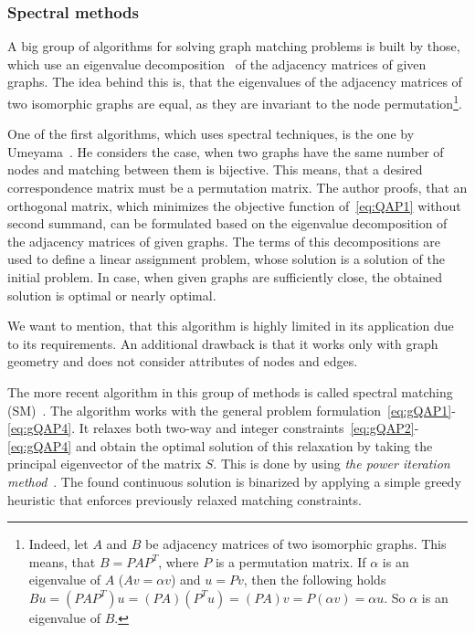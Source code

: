\subsubsection{Spectral methods}
A big group of algorithms for solving graph matching problems is built by those, which use an eigenvalue decomposition~\cite{Book_ConvOpt} of the adjacency matrices of given graphs. The idea behind this is, that the eigenvalues of the adjacency matrices of two isomorphic graphs are equal, as they are invariant to the node permutation\footnote{Indeed, let $A$ and $B$ be adjacency matrices of two isomorphic graphs. This means, that $B=PAP^T$, where $P$ is a permutation matrix. If $\alpha$ is an eigenvalue of $A$ ($Av=\alpha v$) and $u=Pv$, then the following holds $Bu=(PAP^T)u=(PA)(P^Tu)=(PA)v=P(\alpha v)=\alpha u$. So $\alpha$ is an eigenvalue of $B$.}.

One of the first algorithms, which uses spectral techniques, is the one by Umeyama\newline~\cite{Umeyam1988}. He considers the case, when two graphs have the same number of nodes and matching between them is bijective. This means, that a desired correspondence matrix must be a permutation matrix. The author proofs, that an orthogonal matrix, which minimizes the objective function of~\eqref{eq:QAP1} without second summand, can be formulated based on the eigenvalue decomposition of the adjacency matrices of given graphs. The terms of this decompositions are used to define a linear assignment problem, whose solution is a solution of the initial problem. In case, when given graphs are sufficiently close, the obtained solution is optimal or nearly optimal.

We want to mention, that this algorithm is highly limited in its application due to its requirements. An additional drawback is that it works only with graph geometry and does not consider attributes of nodes and edges.

The more recent algorithm in this group of methods is called spectral matching (SM)~\cite{Leordeanu2005_SM}. The algorithm works with the general problem formulation~\eqref{eq:gQAP1}-\eqref{eq:gQAP4}. It relaxes both two-way and integer constraints~\eqref{eq:gQAP2}-\eqref{eq:gQAP4} and obtain the optimal solution of this relaxation by taking the principal eigenvector of the matrix $S$. This is done by using \emph{the power iteration method}~\cite{PowerIteration}. The found continuous solution is binarized by applying a simple greedy heuristic that enforces previously relaxed matching constraints.


